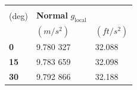 \documentclass[
]{book}
\begin{document}
\begin{longtable}[]{@{}lll@{}}
\toprule
\begin{minipage}[b]{0.18\columnwidth}\raggedright
\textbf{Latitude\\
(deg)}\strut
\end{minipage} & \begin{minipage}[b]{0.30\columnwidth}\raggedright
\textbf{Normal}
\(g_{\mathrm{local}}\)\strut
\end{minipage} & \begin{minipage}[b]{0.25\columnwidth}\raggedright
\strut
\end{minipage}\tabularnewline
\midrule
\endhead
\begin{minipage}[t]{0.18\columnwidth}\raggedright
\strut
\end{minipage} & \begin{minipage}[t]{0.30\columnwidth}\raggedright
\((m/s^2)\)\strut
\end{minipage} & \begin{minipage}[t]{0.25\columnwidth}\raggedright
\((ft/s^2)\)\strut
\end{minipage}\tabularnewline
\begin{minipage}[t]{0.18\columnwidth}\raggedright
\textbf{0}\strut
\end{minipage} & \begin{minipage}[t]{0.30\columnwidth}\raggedright
9.780 327\strut
\end{minipage} & \begin{minipage}[t]{0.25\columnwidth}\raggedright
32.088\strut
\end{minipage}\tabularnewline
\begin{minipage}[t]{0.18\columnwidth}\raggedright
\textbf{15}\strut
\end{minipage} & \begin{minipage}[t]{0.30\columnwidth}\raggedright
9.783 659\strut
\end{minipage} & \begin{minipage}[t]{0.25\columnwidth}\raggedright
32.098\strut
\end{minipage}\tabularnewline
\begin{minipage}[t]{0.18\columnwidth}\raggedright
\textbf{30}\strut
\end{minipage} & \begin{minipage}[t]{0.30\columnwidth}\raggedright
9.792 866\strut
\end{minipage} & \begin{minipage}[t]{0.25\columnwidth}\raggedright
32.188\strut

\end{minipage}
\end{longtable}
\end{document}
